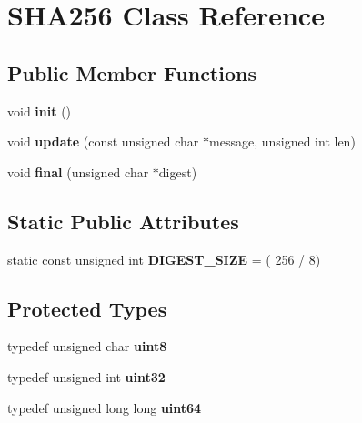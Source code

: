 \hypertarget{class_s_h_a256}{}\section{S\+H\+A256 Class Reference}
\label{class_s_h_a256}
\subsection*{Public Member Functions}
\begin{DoxyCompactItemize}
\item 
\mbox{\label{class_s_h_a256_a9893152e0b8a75ebed254509dfb1eb4a}} 
void {\bfseries init} ()
\item 
\mbox{\label{class_s_h_a256_a2ab5f18a14b4493671e7d0c4a636b4c6}} 
void {\bfseries update} (const unsigned char $\ast$message, unsigned int len)
\item 
\mbox{\label{class_s_h_a256_ae28a257b66be069cc850d49dfe3d48f9}} 
void {\bfseries final} (unsigned char $\ast$digest)
\end{DoxyCompactItemize}
\subsection*{Static Public Attributes}
\begin{DoxyCompactItemize}
\item 
\mbox{\label{class_s_h_a256_a62ea97291cac7ce713ac2cf69219851b}} 
static const unsigned int {\bfseries D\+I\+G\+E\+S\+T\+\_\+\+S\+I\+ZE} = ( 256 / 8)
\end{DoxyCompactItemize}
\subsection*{Protected Types}
\begin{DoxyCompactItemize}
\item 
\mbox{\label{class_s_h_a256_a2d30c8d80b241471affd735f5f5e9925}} 
typedef unsigned char {\bfseries uint8}
\item 
\mbox{\label{class_s_h_a256_a90dbb66f84c4c8c985aaa099a0ef3b54}} 
typedef unsigned int {\bfseries uint32}
\item 
\mbox{\label{class_s_h_a256_a4c998d0c4b147e28438e6b5749cb987e}} 
typedef unsigned long long {\bfseries uint64}
\end{DoxyCompactItemize}
